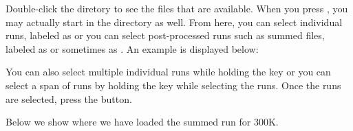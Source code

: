 Double-click the  diretory to see the files that are available. When you press , you may actually start in the  directory as well. From here, you can select individual runs, labeled as  or you can select post-processed runs such as summed files, labeled as  or sometimes as .  An example is displayed below:

\noindent{}

You can also select multiple individual runs while holding the  key or you can select a span of runs by holding the  key while selecting the runs. Once the runs are selected, press the  button. 

Below we show where we have loaded the summed run for 300K. 

\noindent{} \label{fig_multiBraggBanks}

